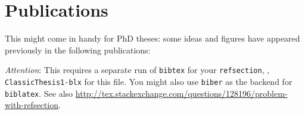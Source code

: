 \chapter*{Publications}
This might come in handy for PhD theses: some ideas and figures have appeared previously in the following publications:


\begin{refsection}[ownpubs]
    \small
    \nocite{*} %
    \printbibliography[heading=none]
\end{refsection}

\emph{Attention}: This requires a separate run of \texttt{bibtex} for your \texttt{refsection}, \eg, \texttt{ClassicThesis1-blx} for this file. You might also use \texttt{biber} as the backend for \texttt{biblatex}. See also \url{http://tex.stackexchange.com/questions/128196/problem-with-refsection}.
